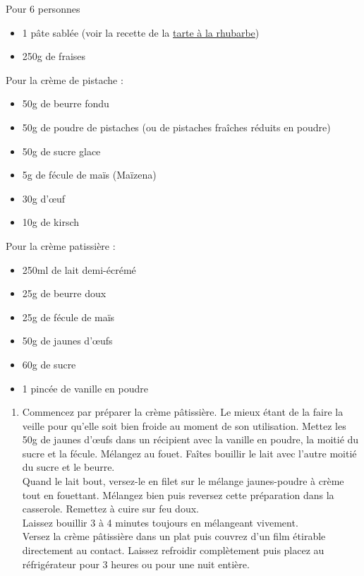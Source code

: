 \bigskip
{}
{Pour 6 personnes}{\begin{itemize}
\item 1 pâte sablée (voir la recette de la \hyperref[TarteRhubarbe]{tarte à la rhubarbe})
\item 250g de fraises
\end{itemize}
Pour la crème de pistache :
\begin{itemize}
\item 50g de beurre fondu
\item 50g de poudre de pistaches (ou de pistaches fraîches réduits en poudre)
\item 50g de sucre glace
\item 5g de fécule de maïs (Maïzena)
\item 30g d'\oe uf
\item 10g de kirsch
\end{itemize}
Pour la crème patissière :
\begin{itemize}
\item 250ml de lait demi-écrémé
\item 25g de beurre doux
\item 25g de fécule de maïs
\item 50g de jaunes d'\oe ufs
\item 60g de sucre
\item 1 pincée de vanille en poudre
\end{itemize}
}{\begin{enumerate}
\item Commencez par préparer la crème pâtissière. Le mieux étant de la faire la veille pour qu'elle soit bien froide au moment de son utilisation. Mettez les 50g de jaunes d'\oe ufs dans un récipient avec la vanille en poudre, la moitié du sucre et la fécule. Mélangez au fouet. Faîtes bouillir le lait avec l'autre moitié du sucre et le beurre.\\
Quand le lait bout, versez-le en filet sur le mélange jaunes-poudre à crème tout en fouettant. Mélangez bien puis reversez cette préparation dans la casserole. Remettez à cuire sur feu doux.\\
Laissez bouillir 3 à 4 minutes toujours en mélangeant vivement.\\
Versez la crème pâtissière dans un plat puis couvrez d'un film étirable directement au contact. Laissez refroidir complètement puis placez au réfrigérateur pour 3 heures ou pour une nuit entière.

\end{enumerate}}
